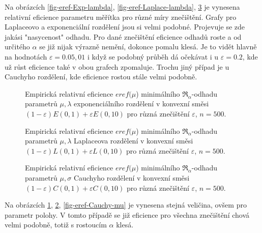 Na obrázcích \ref{fig-eref-Exp-lambda}, \ref{fig-eref-Laplace-lambda}, \ref{fig-eref-Cauchy-sigma} je vynesena relativní eficience parametru měřítka pro různé míry znečištění. Grafy pro Laplaceovo a exponenciální rozdělení jsou si velmi podobné. Projevuje se zde jakási "nasycenost" odhadu. Pro dané znečištění eficience odhadů roste a od určitého $\alpha$ se již nijak výrazně nemění, dokonce pomalu klesá. Je to vidět hlavně na hodnotách $\varepsilon = 0.05,01$ i když se podobný průběh dá očekávat i u $\varepsilon = 0.2$, kde už růst eficience také v obou grafech zpomaluje. Trochu jiný případ je u Cauchyho rozdělení, kde eficience rostou stále velmi podobně. 

\begin{figure}[htb]
	\begin{center}
		\caption{ Empirická relativní eficience $eref({\mu}$) minimálního $\mathfrak{R}_\alpha$-odhadu parametrů  $\mu,\lambda$ exponenciálního rozdělení v konvexní směsi	$(1-\varepsilon)E(0,1) + \varepsilon E(0,10)$ pro různá znečištění $\varepsilon $, $n=500$. }
		\label{fig-eref-Exp-mu}
	\end{center}
\end{figure}

\begin{figure}[htb]
	\begin{center}
		\caption{ Empirická relativní eficience $eref({\mu}$) minimálního $\mathfrak{R}_\alpha$-odhadu parametrů  $\mu,\lambda$ Laplaceova rozdělení v konvexní směsi	$(1-\varepsilon)L(0,1) + \varepsilon L(0,10)$ pro různá znečištění $\varepsilon$, $n=500$. }
		\label{fig-eref-Laplace-mu}
	\end{center}
\end{figure}

\begin{figure}[htb]
	\begin{center}
		\caption{Empirická relativní eficience $eref({\mu}$) minimálního $\mathfrak{R}_\alpha$-odhadu parametrů  $\mu,\sigma$ Cauchyho rozdělení v konvexní směsi	$(1-\varepsilon)C(0,1) + \varepsilon C(0,10)$ pro různá znečištění $\varepsilon$, $n=500$.}
		\label{fig-eref-Cauchy-sigma}
	\end{center}
\end{figure}

Na obrázcích \ref{fig-eref-Exp-mu}, \ref{fig-eref-Laplace-mu}, \ref{fig-eref-Cauchy-mu} je vynesena stejná veličina, ovšem pro parametr polohy. V tomto případě se již eficience pro všechna znečištění chová velmi podobně, totiž s rostoucím $\alpha$ klesá. 